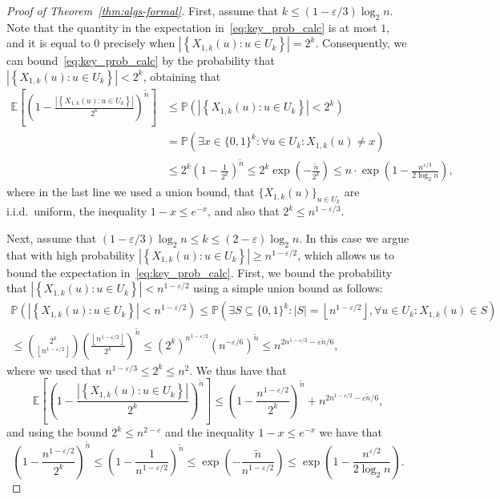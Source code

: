 \documentclass[10pt,a4paper]{amsart}
\newcommand{\E}{\mathbb{E}}
\renewcommand{\Pr}{\mathbb{P}}
\newcommand{\eps}{\varepsilon}
\begin{document}
\begin{proof}[Proof of Theorem~\ref{thm:algs-formal}]
First, assume that $k \leq (1-\eps/3) \log_{2} n$. 
Note that the quantity in the expectation in~\eqref{eq:key_prob_calc} is at most $1$, and it is equal to $0$ precisely when 
$\left| \left\{ X_{1,k}(u) : u \in U_{k} \right\} \right| = 2^{k}$. 
Consequently, we can bound~\eqref{eq:key_prob_calc} by the probability that 
$\left| \left\{ X_{1,k}(u) : u \in U_{k} \right\} \right| < 2^{k}$, 
obtaining that 
\begin{align*}
\E \left[ \left( 1 - \frac{\left| \left\{ X_{1,k}(u) : u \in U_{k} \right\} \right|}{2^{k}} \right)^{\widetilde{n}} \right]
&\leq 
\Pr \left( \left| \left\{ X_{1,k}(u) : u \in U_{k} \right\} \right| < 2^{k} \right) \\
&= \Pr \left( \exists x \in \{0,1\}^{k} : \forall u \in U_{k} : X_{1,k}(u) \neq x \right) \\
&\leq 2^{k} \left( 1 - \frac{1}{2^{k}} \right)^{\widetilde{n}} 
\leq 2^{k} \exp \left( - \frac{\widetilde{n}}{2^{k}} \right) 
\leq n \cdot \exp \left( 1 - \frac{n^{\eps/3}}{2 \log_2 n} \right),
\end{align*}
where in the last line we used a union bound, 
that $\{ X_{1,k}(u) \}_{u \in U_{k}}$ are i.i.d.\ uniform, 
the inequality $1-x \leq e^{-x}$, 
and also that $2^{k} \leq n^{1-\eps/3}$. 


Next, assume that 
$(1-\eps/3) \log_{2} n \leq k \leq (2-\eps) \log_{2} n$. 
In this case we argue that with high probability 
$\left| \left\{ X_{1,k}(u) : u \in U_{k} \right\} \right| \geq n^{1-\eps/2}$, 
which allows us to bound the expectation in~\eqref{eq:key_prob_calc}. 
First, we bound the probability that 
$\left| \left\{ X_{1,k}(u) : u \in U_{k} \right\} \right| < n^{1-\eps/2}$
using a simple union bound as follows: 
\begin{multline*}
\Pr \left( \left| \left\{ X_{1,k}(u) : u \in U_{k} \right\} \right| < n^{1-\eps/2} \right) 
\leq 
\Pr \left( \exists S \subseteq \{0,1\}^{k} : |S| = \left\lfloor n^{1-\eps/2} \right\rfloor, \forall u \in U_{k} : X_{1,k}(u) \in S \right) \\
\leq \binom{2^{k}}{\left\lfloor n^{1-\eps/2} \right\rfloor} \left( \frac{\left\lfloor n^{1-\eps/2} \right\rfloor}{2^{k}} \right)^{\widetilde{n}} 
\leq \left( 2^{k} \right)^{n^{1-\eps/2}} \left( n^{-\eps/6} \right)^{\widetilde{n}} 
\leq n^{2n^{1-\eps/2} - \eps \widetilde{n}/6},
\end{multline*}
where we used that 
$n^{1-\eps/3} \leq 2^{k} \leq n^{2}$. We thus have that 
\[
\E \left[ \left( 1 - \frac{\left| \left\{ X_{1,k}(u) : u \in U_{k} \right\} \right|}{2^{k}} \right)^{\widetilde{n}} \right] 
\leq 
\left( 1 - \frac{n^{1-\eps/2}}{2^{k}} \right)^{\widetilde{n}} + n^{2n^{1-\eps/2} - \eps \widetilde{n}/6},
\]
and using the bound $2^{k} \leq n^{2-\eps}$ and the inequality $1-x \leq e^{-x}$ we have that 
\[
\left( 1 - \frac{n^{1-\eps/2}}{2^{k}} \right)^{\widetilde{n}} 
\leq 
\left( 1 - \frac{1}{n^{1-\eps/2}} \right)^{\widetilde{n}} 
\leq \exp \left( - \frac{\widetilde{n}}{n^{1-\eps/2}} \right) 
\leq \exp \left( 1 - \frac{n^{\eps/2}}{2 \log_2 n} \right).
\]



\end{proof}
\end{document}
